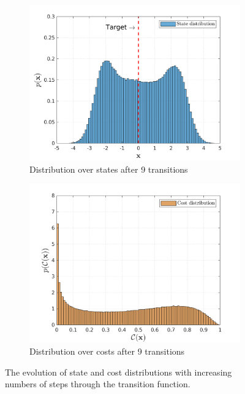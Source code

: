 \begin{figure}[htp!]
  \begin{subfigure}[b]{0.49\linewidth}
    \centering
    \includegraphics[height=0.25\textheight,width=1\textwidth]{Chapter3/Figures/trans_traj_hist_4.png} 
    \caption{Distribution over states after 9 transitions} 
    \label{Fig:Re-hist-traj-4} 
  \end{subfigure}
  \begin{subfigure}[b]{0.49\linewidth}
    \centering
    \includegraphics[height=0.25\textheight,width=1\textwidth]{Chapter3/Figures/trans_cost_hist_4.png} 
    \caption{Distribution over costs after 9 transitions} 
    \label{Fig:Re-hist-cost-4} 
  \end{subfigure} 
\caption[Evolution of state and cost distributions]{The evolution of state and cost distributions with increasing numbers of steps through the transition function.}
\label{Fig:Re-evolution-of-state-and-cost} 
\end{figure}


